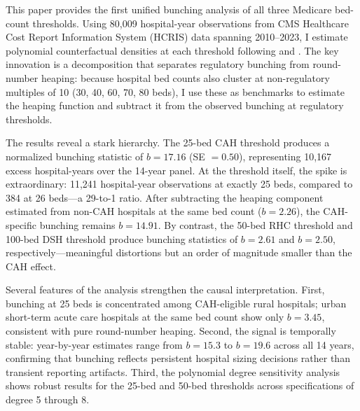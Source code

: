\documentclass[12pt]{article}
\begin{document}
This paper provides the first unified bunching analysis of all three Medicare bed-count thresholds. Using 80,009 hospital-year observations from CMS Healthcare Cost Report Information System (HCRIS) data spanning 2010--2023, I estimate polynomial counterfactual densities at each threshold following \citet{Kleven2016} and \citet{ChettyFriedmanSaez2013}. The key innovation is a decomposition that separates regulatory bunching from round-number heaping: because hospital bed counts also cluster at non-regulatory multiples of 10 (30, 40, 60, 70, 80 beds), I use these as benchmarks to estimate the heaping function and subtract it from the observed bunching at regulatory thresholds.

The results reveal a stark hierarchy. The 25-bed CAH threshold produces a normalized bunching statistic of $b = 17.16$ (SE $= 0.50$), representing 10,167 excess hospital-years over the 14-year panel. At the threshold itself, the spike is extraordinary: 11,241 hospital-year observations at exactly 25 beds, compared to 384 at 26 beds---a 29-to-1 ratio. After subtracting the heaping component estimated from non-CAH hospitals at the same bed count ($b = 2.26$), the CAH-specific bunching remains $b = 14.91$. By contrast, the 50-bed RHC threshold and 100-bed DSH threshold produce bunching statistics of $b = 2.61$ and $b = 2.50$, respectively---meaningful distortions but an order of magnitude smaller than the CAH effect.

Several features of the analysis strengthen the causal interpretation. First, bunching at 25 beds is concentrated among CAH-eligible rural hospitals; urban short-term acute care hospitals at the same bed count show only $b = 3.45$, consistent with pure round-number heaping. Second, the signal is temporally stable: year-by-year estimates range from $b = 15.3$ to $b = 19.6$ across all 14 years, confirming that bunching reflects persistent hospital sizing decisions rather than transient reporting artifacts. Third, the polynomial degree sensitivity analysis shows robust results for the 25-bed and 50-bed thresholds across specifications of degree 5 through 8.
\end{document}
